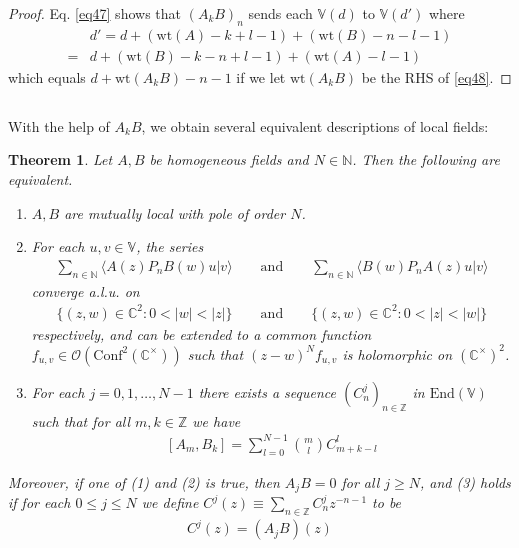 \documentclass[12pt,b5paper,notitlepage]{article}
\theoremstyle{definition}
\theoremstyle{plain}
\newtheorem{thm}[df]{Theorem}
\newcommand{\End}{\mathrm{End}} %
\newcommand{\Conf}{\mathrm{Conf}}
\newcommand{\bk}[1]{\langle {#1}\rangle}
\newcommand{\scr}{\mathscr}
\newcommand{\Vbb}{\mathbb V}
\newcommand{\Cbb}{\mathbb C}
\newcommand{\Nbb}{\mathbb N}
\newcommand{\Zbb}{\mathbb Z}
\newcommand{\wt}{\mathrm{wt}}
\numberwithin{equation}{section}
\begin{document}
\begin{proof}
Eq. \eqref{eq47} shows that $(A_kB)_n$ sends each $\Vbb(d)$ to $\Vbb(d')$ where
\begin{align*}
&d'=d+(\wt(A)-k+l-1)+(\wt(B)-n-l-1)\\
=&d+(\wt(B)-k-n+l-1)+(\wt(A)-l-1)
\end{align*}
which equals $d+\wt(A_kB)-n-1$ if we let $\wt(A_kB)$ be the RHS of \eqref{eq48}.
\end{proof}



\subsection{}


With the help of $A_kB$, we obtain several equivalent descriptions of local fields:

\begin{thm}\label{lb27}
Let $A,B$ be homogeneous fields and $N\in\Nbb$. Then the following are equivalent.
\begin{enumerate}[label=(\arabic*)]
\item $A,B$ are mutually local with pole of order $N$.
\item For each $u,v\in\Vbb$, the series
\begin{gather}
\sum_{n\in\Nbb}\bk{A(z)P_nB(w)u|v}\qquad\text{and}\qquad \sum_{n\in\Nbb}\bk{B(w)P_nA(z)u|v}
\end{gather}
converge a.l.u. on
\begin{align}
\{(z,w)\in\Cbb^2:0<|w|<|z|\}\qquad\text{and}\qquad\{(z,w)\in\Cbb^2:0<|z|<|w|\}
\end{align}
respectively, and can be extended to a common function $f_{u,v}\in\scr O(\Conf^2(\Cbb^\times))$ such that $(z-w)^Nf_{u,v}$ is holomorphic on $(\Cbb^\times)^2$.
\item For each $j=0,1,\dots,N-1$ there exists a sequence $(C^j_n)_{n\in\Zbb}$ in $\End(\Vbb)$ such that for all $m,k\in\Zbb$ we have
\begin{align}\label{eq49}
[A_m,B_k]=\sum_{l=0}^{N-1}{m\choose l}C^l_{m+k-l}
\end{align}
\end{enumerate}
Moreover, if one of (1) and (2) is true, then $A_jB=0$ for all $j\geq N$, and (3) holds if for each $0\leq j\leq N$ we define $C^j(z)\equiv\sum_{n\in\Zbb}C^j_nz^{-n-1}$ to be
\begin{align*}
C^j(z)=(A_jB)(z)
\end{align*}
\end{thm}
\end{document}
